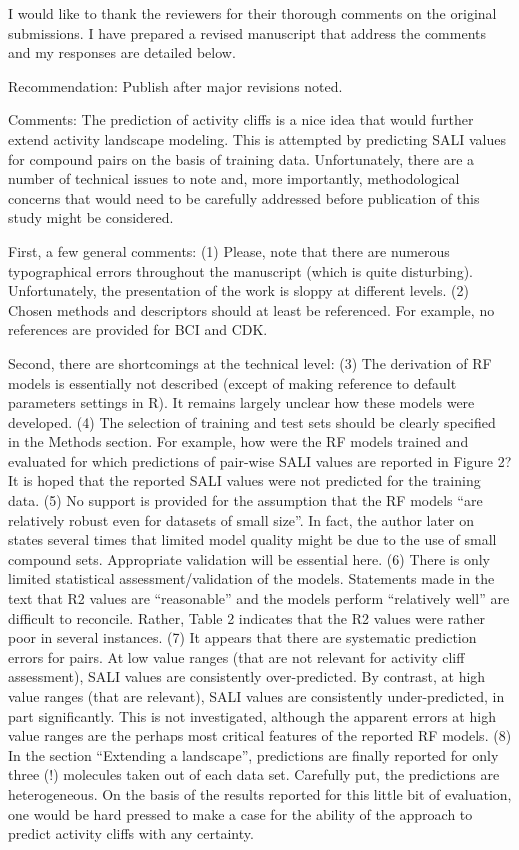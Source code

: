 \documentclass[letterpaper, 12pt]{article}
\begin{document}
I would like to thank the reviewers for their thorough comments on the original submissions. I have
prepared a revised manuscript that address the comments and my responses are detailed below.


Recommendation: Publish after major revisions noted.

Comments:
The prediction of activity cliffs is a nice idea that would further extend activity landscape modeling. This is attempted by predicting SALI values for compound pairs on the basis of training data. Unfortunately, there are a number of technical issues to note and, more importantly, methodological concerns that would need to be carefully addressed before publication of this study might be considered.  

First, a few general comments: 
(1) Please, note that there are numerous typographical errors throughout the manuscript (which is quite disturbing). Unfortunately, the presentation of the work is sloppy at different levels.       
(2) Chosen methods and descriptors should at least be referenced. For example, no references are provided for BCI and CDK.

Second, there are shortcomings at the technical level:
(3) The derivation of RF models is essentially not described (except of making reference to default parameters settings in R). It remains largely unclear how these models were developed. 
(4) The selection of training and test sets should be clearly specified in the Methods section. For example, how were the RF models trained and evaluated for which predictions of pair-wise SALI values are reported in Figure 2? It is hoped that the reported SALI values were not predicted for the training data.
(5) No support is provided for the assumption that the RF models “are relatively robust even for datasets of small size”. In fact, the author later on states several times that limited model quality might be due to the use of small compound sets. Appropriate validation will be essential here.
(6) There is only limited statistical assessment/validation of the models. Statements made in the text that R2 values are “reasonable” and the models perform “relatively well” are difficult to reconcile. Rather, Table 2 indicates that the R2 values were rather poor in several instances.
(7) It appears that there are systematic prediction errors for pairs. At low value ranges (that are not relevant for activity cliff assessment), SALI values are consistently over-predicted. By contrast, at high value ranges (that are relevant), SALI values are consistently under-predicted, in part significantly. This is not investigated, although the apparent errors at high value ranges are the perhaps most critical features of the reported RF models.    
(8) In the section “Extending a landscape”, predictions are finally reported for only three (!) molecules taken out of each data set. Carefully put, the predictions are heterogeneous. On the basis of the results reported for this little bit of evaluation, one would be hard pressed to make a case for the ability of the approach to predict activity cliffs with any certainty.        
\end{document}

